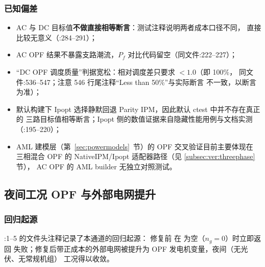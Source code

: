 \subsubsection*{已知偏差}
\begin{itemize}
  \item AC 与 DC 目标值\textbf{不做直接相等断言}：测试注释说明两者成本口径不同，
        直接比较无意义（:284--291）；
  \item AC OPF 结果不暴露支路潮流，$P_f$ 对比代码留空（同文件:222--227）；
  \item “DC OPF 调度质量”判据宽松：相对调度差只要求 $<1.0$（即 100\%，
        同文件:536--547；注意 546 行尾注释“Less than 50\%”与实际断言 
        不一致，以断言为准）；
  \item 默认构建下 Ipopt 选择静默回退 Parity IPM，因此默认 ctest 中并不存在真正的
        三路目标值相等断言；Ipopt 侧的数值证据来自隐藏性能用例与文档实测
        （:195--220）；
  \item AML 建模层（第~\ref{sec:powermodels}~节）的 OPF 交叉验证目前主要体现在
        三相混合 OPF 的 NativeIPM/Ipopt 适配器路径（见 \ref{subsec:ver:threephase} 节），
        AC OPF 的 AML builder 无独立对照测试。
\end{itemize}

\subsection{夜间工况 OPF 与外部电网提升}\label{subsec:ver:nighttime}

\subsubsection*{回归起源}
:1--5 的文件头注释记录了本通道的回归起源：
修复前  在  为空（$n_g=0$）时立即返回
失败；修复后带正成本的外部电网被提升为 OPF 发电机变量，夜间（无光伏、无常规机组）
工况得以收敛。


